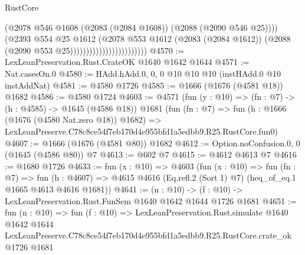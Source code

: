 \begin{lexlean}{RustCore}
\begin{coremodule}
                                              (@2078
                                                @546
                                                @1608
                                                (@2083 (@2084 @1608))
                                                (@2088 (@2090 @546 @25))))
                                            (@2393
                                              @554
                                              @25
                                              @1612
                                              (@2078
                                                @553
                                                @1612
                                                (@2083 (@2084 @1612))
                                                (@2088 (@2090 @553 @25))))))))))))))))))))))))
@4570 := LexLeanPreservation.Rust.CrateOK @1640 @1642 @1644
@4571 := Nat.casesOn.{0}
@4580 := HAdd.hAdd.{0, 0, 0} @10 @10 @10 (instHAdd.{0} @10 instAddNat)
@4581 := @4580 @1726
@4585 := @1666 (@1676 (@4581 @18)) @1682
@4586 := @4580 @1724
@4603 := @4571
    (fun (y : @10) => (fn : @7) -> (h : @4585) -> @1645 (@4586 @18))
    @1681
    (fun (fn : @7) =>
    fun (h : @1666 (@1676 (@4580 Nat.zero @18)) @1682) =>
    LexLeanPreserve.C78c8ce54f7eb170d4e955bfd1a5edbb9.R25.RustCore.fun0)
@4607 := @1666 (@1676 (@4581 @80)) @1682
@4612 := Option.noConfusion.{0, 0} (@1645 (@4586 @80)) @7
@4613 := @602 @7
@4615 := @4612 @4613 @7
@4616 := @1680 @1726
@4633 := fun (x : @10) =>
  @4603
    (fun (x : @10) =>
    fun (fn : @7) =>
    fun (h : @4607) =>
    @4615 @4616 (Eq.refl.{2} (Sort 1) @7) (heq_of_eq.{1} @1665 @4613 @4616 @1681))
@4641 := (n : @10) -> (f : @10) -> LexLeanPreservation.Rust.FunSem @1640 @1642 @1644 @1726 @1681
@4651 := fun (n : @10) =>
  fun (f : @10) =>
  LexLeanPreservation.Rust.simulate
    @1640
    @1642
    @1644
    LexLeanPreserve.C78c8ce54f7eb170d4e955bfd1a5edbb9.R25.RustCore.crate_ok
    @1726
    @1681
\end{coremodule}
\end{lexlean}
